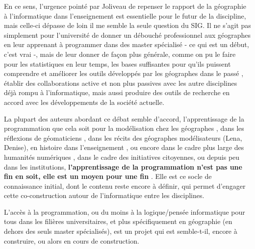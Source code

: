
En ce sens, l'urgence pointé par Joliveau de repenser le rapport de la géographie à l'informatique dans l'enseignement est essentielle pour le futur de la discipline, mais celle-ci dépasse de loin il me semble la seule question du SIG. Il ne s'agit pas simplement pour l'université de donner un débouché professionnel aux géographes en leur apprenant à programmer dans des master spécialisé - ce qui est un début, c'est vrai -, mais de leur donner de façon plus générale, comme on pu le faire pour les statistiques en leur temps, les bases suffisantes pour qu'ils puissent comprendre et améliorer les outils développés par les géographes dans le passé , établir des collaborations active et non plus passives avec les autre disciplines déjà rompu à l'informatique, mais aussi produire des outils de recherche en accord avec les développements de la société actuelle. 

La plupart des auteurs abordant ce débat semble d'accord, l'apprentissage de la programmation que cela soit pour la modélisation chez les géographes \autocite[64]{Banos2013}, dans les réflexions de géomaticiens \autocite{Joliveau2004}, dans les récits des géographes modélisateurs (Lena, Denise), en histoire dans l'enseignement \autocite{Genet1993}, ou encore dans le cadre plus large des humanités numériques , dans le cadre des initiatives citoyennes, ou depuis peu dans les institutions, \textbf{l'apprentissage de la programmation n'est pas une fin en soit, elle est un moyen pour une fin} \textcite[67]{Plantin2014}. Elle est ce socle de connaissance initial, dont le contenu reste encore à définir, qui permet d'engager cette co-construction autour de l'informatique entre les disciplines.

L'accès à la programmation, ou du moins à la logique/pensée informatique pour tous dans les filières universitaires, et plus spécifiquement en géographie (en dehors des seuls master spécialisés), est un projet qui est semble-t-il, encore à construire, ou alors en cours de construction.



